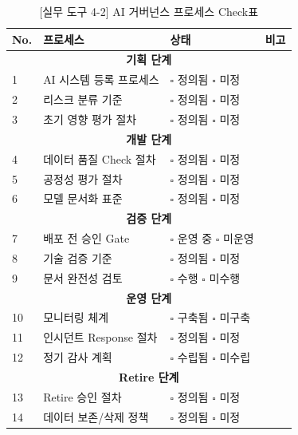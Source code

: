 \begin{table}[htbp]
\centering
\caption{[실무 도구 4-2] AI 거버넌스 프로세스 Check표}
\label{tab:process_checklist}
\begin{tabularx}{\textwidth}{|p{0.5cm}|p{5cm}|p{2.5cm}|X|}
\hline
\textbf{No.} & \textbf{프로세스} & \textbf{상태} & \textbf{비고} \\
\hline
\multicolumn{4}{|c|}{\textbf{기획 단계}} \\
\hline
1 & AI 시스템 등록 프로세스 & $\square$ 정의됨 $\square$ 미정 & \\
\hline
2 & 리스크 분류 기준 & $\square$ 정의됨 $\square$ 미정 & \\
\hline
3 & 초기 영향 평가 절차 & $\square$ 정의됨 $\square$ 미정 & \\
\hline
\multicolumn{4}{|c|}{\textbf{개발 단계}} \\
\hline
4 & 데이터 품질 Check 절차 & $\square$ 정의됨 $\square$ 미정 & \\
\hline
5 & 공정성 평가 절차 & $\square$ 정의됨 $\square$ 미정 & \\
\hline
6 & 모델 문서화 표준 & $\square$ 정의됨 $\square$ 미정 & \\
\hline
\multicolumn{4}{|c|}{\textbf{검증 단계}} \\
\hline
7 & 배포 전 승인 Gate & $\square$ 운영 중 $\square$ 미운영 & \\
\hline
8 & 기술 검증 기준 & $\square$ 정의됨 $\square$ 미정 & \\
\hline
9 & 문서 완전성 검토 & $\square$ 수행 $\square$ 미수행 & \\
\hline
\multicolumn{4}{|c|}{\textbf{운영 단계}} \\
\hline
10 & 모니터링 체계 & $\square$ 구축됨 $\square$ 미구축 & \\
\hline
11 & 인시던트 Response 절차 & $\square$ 정의됨 $\square$ 미정 & \\
\hline
12 & 정기 감사 계획 & $\square$ 수립됨 $\square$ 미수립 & \\
\hline
\multicolumn{4}{|c|}{\textbf{Retire 단계}} \\
\hline
13 & Retire 승인 절차 & $\square$ 정의됨 $\square$ 미정 & \\
\hline
14 & 데이터 보존/삭제 정책 & $\square$ 정의됨 $\square$ 미정 & \\
\hline
\end{tabularx}
\end{table}
